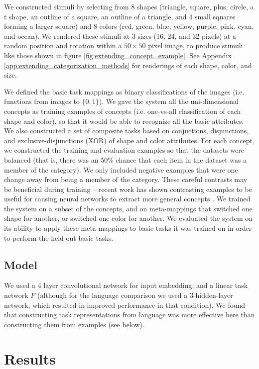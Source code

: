 We constructed stimuli by selecting from 8 shapes (triangle, square, plus, circle, a t shape, an outline of a square, an outline of a triangle, and 4 small squares forming a larger square) and 8 colors (red, green, blue, yellow, purple, pink, cyan, and ocean). We rendered these stimuli at 3 sizes (16, 24, and 32 pixels) at a random position and rotation within a \(50 \times 50\) pixel image, to produce stimuli like those shown in figure \ref{fig:extending_concept_example}. See Appendix \ref{app:extending_categorization_methods} for renderings of each shape, color, and size. \par
We defined the basic task mappings as binary classifications of the images (i.e. functions from images to \(\{0, 1\}\)). We gave the system all the uni-dimensional concepts as training examples of concepts (i.e. one-vs-all classification of each shape and color), so that it would be able to recognize all the basic attributes. We also constructed a set of composite tasks based on conjuctions, disjunctions, and exclusive-disjunctions (XOR) of shape and color attributes. For each concept, we constructed the training and evaluation examples so that the datasets were balanced (that is, there was an 50\% chance that each item in the dataset was a member of the category). We only included negative examples that were one change away from being a member of the category. These careful contrasts may be beneficial during training -- recent work has shown contrasting examples to be useful for causing neural networks to extract more general concepts \citep{Hill2019}. We trained the system on a subset of the concepts, and on meta-mappings that switched one shape for another, or switched one color for another. We evaluated the system on its ability to apply these meta-mappings to basic tasks it was trained on in order to perform the held-out basic tasks. \par  

\subsection{Model}
We used a 4 layer convolutional network for input embedding, and a linear task network \(F\) (although for the language comparison we used a 3-hidden-layer network, which resulted in improved performance in that condition). We found that constructing task representations from language was more effective here than constructing them from examples (see below). 

\section{Results}

